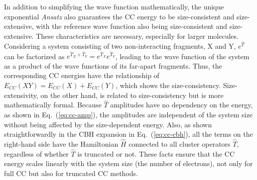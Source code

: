 In addition to simplifying the wave function mathematically, the unique exponential \textit{Ansatz} also guarantees the CC energy to be size-consistent and size-extensive,\cite{Sinanoglu1964, Cizek1966, Cizek1971, Crawford2000} with the reference wave function also being size-consistent and size-extensive. These characteristics are necessary, especially for larger molecules. Considering a system consisting of two non-interacting fragments, X and Y, $e^{\hat{T}}$ can be factorized as $e^{\hat{T}_{X}+\hat{T}_{Y}}=e^{\hat{T}_{X}}e^{\hat{T}_{Y}}$, leading to the wave function of the system as a product of the wave functions of its far-apart fragments. Thus, the corresponding CC energies have the relationship of $E_{CC}(XY) = E_{CC}(X) + E_{CC}(Y)$, which shows the size-consistency. Size-extensivity, on the other hand, is related to size-consistency but is more mathematically formal. Because $\hat{T}$ amplitudes have no dependency on the energy, as shown in Eq.~(\ref{eq:cc-amp}), the amplitudes are independent of the system size without being affected by the size-dependent energy. Also, as shown straightforwardly in the CBH expansion in Eq.~(\ref{eq:cc-cbh}), all the terms on the right-hand side have the Hamiltonian $\hat{H}$ connected to all cluster operators $\hat{T}$, regardless of whether $\hat{T}$ is truncated or not. These facts ensure that the CC energy scales linearly with the system size (the number of electrons), not only for full CC but also for truncated CC methods.

